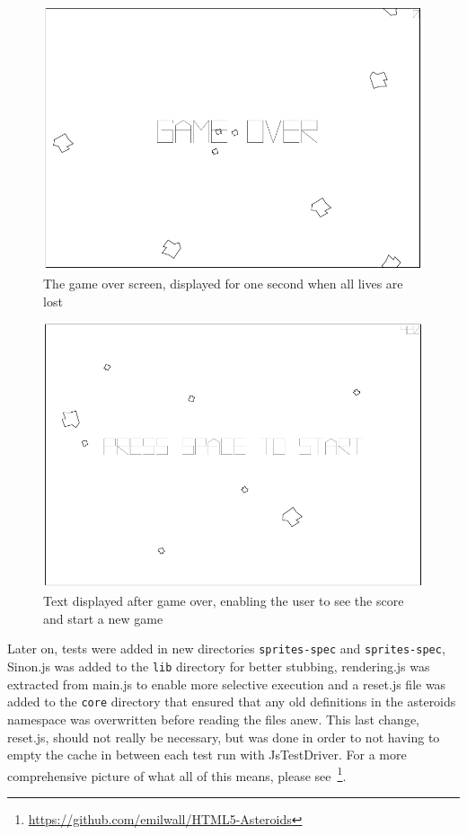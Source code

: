 \documentclass[11pt]{article}
\begin{document}
\begin{figure}[h!]
\centering
\includegraphics[width=1.0\textwidth]{pics/game7.png}
\caption{The game over screen, displayed for one second when all lives are lost}
\label{fig:game7}
\end{figure}

\begin{figure}[h!]
\centering
\includegraphics[width=1.0\textwidth]{pics/game6.png}
\caption{Text displayed after game over, enabling the user to see the score and start a new game}
\label{fig:game6}
\end{figure}

Later on, tests were added in new directories \texttt{sprites-spec} and \texttt{sprites-spec}, Sinon.js was added to the \texttt{lib} directory for better stubbing, rendering.js was extracted from main.js to enable more selective execution and a reset.js file was added to the \texttt{core} directory that ensured that any old definitions in the asteroids namespace was overwritten before reading the files anew. This last change, reset.js, should not really be necessary, but was done in order to not having to empty the cache in between each test run with JsTestDriver. For a more comprehensive picture of what all of this means, please see~\footnote{\url{https://github.com/emilwall/HTML5-Asteroids}}.
\end{document}

